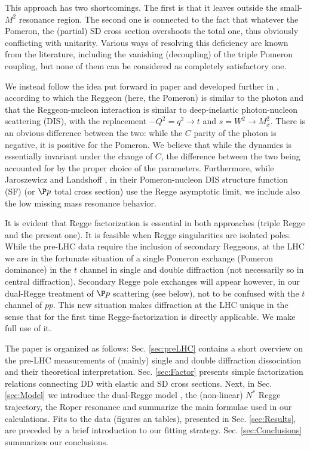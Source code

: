 \documentclass[12pt]{article}
\begin{document}
This approach has two shortcomings. The first is that it leaves outside the small-$M^2$ resonance region. The second one is connected to the fact that whatever the Pomeron, the (partial) SD cross section overshoots the total one, thus obviously conflicting with unitarity. Various ways of resolving this deficiency
are known from the literature, including the vanishing (decoupling) of the triple Pomeron coupling, but none of them can be considered as completely satisfactory one.


We instead follow the idea put forward in paper \cite{JL} and developed further in \cite{PR}, according to which the Reggeon (here, the Pomeron) is similar to the photon and that the Reggeon-nucleon interaction is similar to deep-inelastic photon-nucleon scattering (DIS), with the replacement $-Q^2=q^2\rightarrow t$ and $s=W^2\rightarrow M^2_x$. There is an obvious difference between the two: while the $C$ parity of the photon is negative, it is positive for the Pomeron. We believe that while the dynamics is essentially invariant under the change of $C$, the difference between the two being accounted for by the proper choice of the parameters. Furthermore, while Jaroszewicz and Landshoff \cite{JL}, in their Pomeron-nucleon DIS structure function (SF) (or $\P p$ total cross section) use the Regge asymptotic limit, we include also the low missing mass resonance behavior. 

It is evident that Regge factorization is essential in both approaches (triple Regge and the present one). It is feasible when Regge singularities are isolated poles. While the pre-LHC data require the inclusion of secondary Reggeons, at the LHC we are in the fortunate situation of a single Pomeron exchange (Pomeron dominance) in the $t$ channel in single and double diffraction (not necessarily so in central diffraction). Secondary Regge pole exchanges will appear however, in our  dual-Regge treatment of $\P p$ scattering (see below), not to be confused with the $t$ channel of $pp$.
This new situation makes diffraction at the LHC unique in the sense that for the first time Regge-factorization is directly applicable. We make full use of it.

The paper is organized as follows: Sec. \ref{sec:preLHC} contains a short overview on the pre-LHC measurements of (mainly) single and double diffraction dissociation and their theoretical interpretation. Sec. \ref{sec:Factor} presents simple factorization relations connecting DD with elastic and SD cross sections. Next, in Sec. \ref{sec:Model} we introduce the dual-Regge model \cite{PR}, the (non-linear) $N^*$ Regge trajectory, the Roper resonance and summarize the main formulae used in our calculations. Fits to the data (figures an tables), presented in Sec. \ref{sec:Results}, are preceded by a brief introduction to our fitting strategy.
Sec. \ref{sec:Conclusions} summarizes our conclusions.
\end{document}
